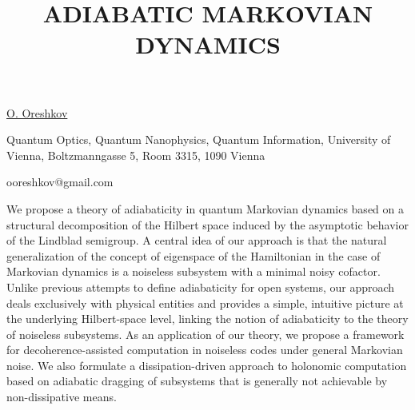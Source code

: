 \title{ADIABATIC MARKOVIAN DYNAMICS}

\underline{O. Oreshkov} 

{\normalsize{\vspace{-4mm}
Quantum Optics, Quantum Nanophysics, Quantum Information, University of Vienna, Boltzmanngasse 5, Room 3315, 1090 Vienna

\email ooreshkov@gmail.com}}

We propose a theory of adiabaticity in quantum Markovian dynamics based on a structural decomposition of the Hilbert space induced by the asymptotic behavior of the Lindblad semigroup. A central idea of our approach is that the natural generalization of the concept of eigenspace of the Hamiltonian in the case of Markovian dynamics is a noiseless subsystem with a minimal noisy cofactor. Unlike previous attempts to define adiabaticity for open systems, our approach deals exclusively with physical entities and provides a simple, intuitive picture at the underlying Hilbert-space level, linking the notion of adiabaticity to the theory of noiseless subsystems. As an application of our theory, we propose a framework for decoherence-assisted computation in noiseless codes under general Markovian noise. We also formulate a dissipation-driven approach to holonomic computation based on adiabatic dragging of subsystems that is generally not achievable by non-dissipative means.

\vspace{\baselineskip} 
